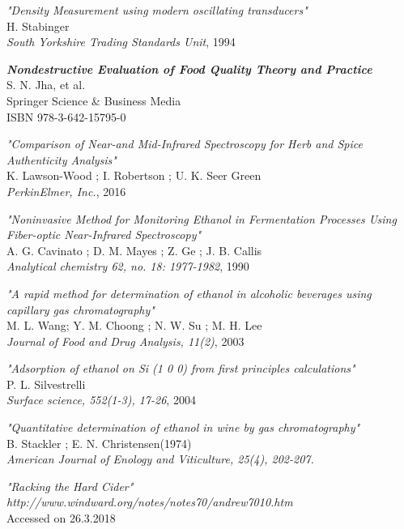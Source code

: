 \documentclass[twoside]{ctuthesis}
\theoremstyle{plain}
\theoremstyle{definition}
\theoremstyle{note}
\begin{document}
\begin{thebibliography}{9}
	\textit{"Density Measurement using modern oscillating transducers"}\\
	H. Stabinger\\
	\textit{South Yorkshire Trading Standards Unit}, 1994

	\textit{\textbf{Nondestructive Evaluation of Food Quality Theory and Practice}}\\
	S. N. Jha, et al.\\
	Springer Science \& Business Media\\
	ISBN 978-3-642-15795-0

	\textit{"Comparison of Near-and Mid-Infrared Spectroscopy for Herb and Spice Authenticity Analysis"}\\
	K. Lawson-Wood ; I. Robertson ; U. K. Seer Green\\
	\textit{PerkinElmer, Inc.}, 2016

	\textit{"Noninvasive Method for Monitoring Ethanol in Fermentation Processes Using Fiber-optic Near-Infrared Spectroscopy"}\\
	A. G. Cavinato ; D. M. Mayes ; Z. Ge ; J. B. Callis\\
	\textit{Analytical chemistry 62, no. 18: 1977-1982}, 1990

	\textit{"A rapid method for determination of ethanol in alcoholic beverages using capillary gas chromatography"}\\
	M. L. Wang; Y. M. Choong ; N. W. Su ; M. H. Lee\\
	\textit{Journal of Food and Drug Analysis, 11(2)}, 2003

	\textit{"Adsorption of ethanol on Si (1 0 0) from first principles calculations"}\\
	P. L. Silvestrelli\\
	\textit{Surface science, 552(1-3), 17-26}, 2004

	\textit{"Quantitative determination of ethanol in wine by gas chromatography"}\\
	B. Stackler ; E. N. Christensen(1974)\\
	\textit{American Journal of Enology and Viticulture, 25(4), 202-207.}
	
	\textit{"Racking the Hard Cider"}\\
	\textit{http://www.windward.org/notes/notes70/andrew7010.htm}\\
	Accessed on 26.3.2018


\end{thebibliography}
\end{document}
